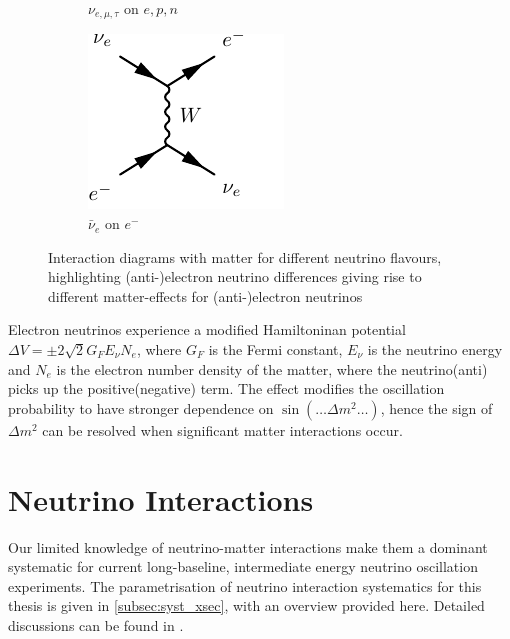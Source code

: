 \begin{figure}[h]
\begin{subfigure}[t]{0.32\textwidth}
		\caption{$\nu_{e,\mu,\tau}$ on $e,p,n$}
	\end{subfigure}
	\begin{subfigure}[t]{0.32\textwidth}
		\centering
		\includegraphics[width=.6\textwidth, trim={0mm 0mm 7mm 0mm}, clip, page=2]{figures/theory/feynmp_crop}
		\caption{$\bar{\nu}_e$ on $e^-$}
	\end{subfigure}
	\caption{Interaction diagrams with matter for different neutrino flavours, highlighting (anti-)electron neutrino differences giving rise to different matter-effects for (anti-)electron neutrinos}
	\label{fig:msw_effect}
\end{figure}

Electron neutrinos experience a modified Hamiltoninan potential $\Delta V = \pm 2\sqrt{2}G_F E_\nu N_e$, where $G_F$ is the Fermi constant, $E_\nu$ is the neutrino energy and $N_e$ is the electron number density of the matter, where the neutrino(anti) picks up the positive(negative) term. The effect modifies the oscillation probability to have stronger dependence on $\sin \left(\ldots \Delta m^2 \ldots \right)$, hence the sign of $\Delta m^2$ can be resolved when significant matter interactions occur\cite{msw_summary}.

\section{Neutrino Interactions}
\label{sec:theory:int}
Our limited knowledge of neutrino-matter interactions make them a dominant systematic for current long-baseline, intermediate energy neutrino oscillation experiments. The parametrisation of neutrino interaction systematics for this thesis is given in \autoref{subsec:syst_xsec}, with an overview provided here. Detailed discussions can be found in \cite{katori_martini,ulrich_review,nieves_review}.

